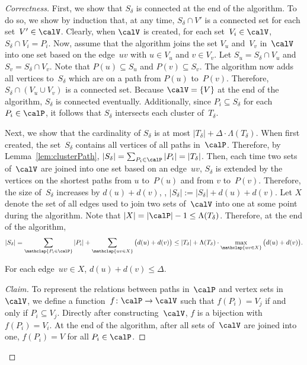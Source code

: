 \begin{proof}
    [Correctness]
First, we show that $S_\delta$ is connected at the end of the algorithm.
To do so, we show by induction that, at any time, $S_\delta \cap V'$ is a connected set for each set~$V' \in \calV$.
Clearly, when $\calV$ is created, for each set~$V_i \in \calV$, $S_\delta \cap V_i = P_i$.
Now, assume that the algorithm joins the set $V_u$ and~$V_v$ in~$\calV$ into one set based on the edge~$uv$ with $u \in V_u$ and $v \in V_v$.
Let $S_u = S_\delta \cap V_u$ and $S_v = S_\delta \cap V_v$.
Note that $P(u) \subseteq S_u$ and $P(v) \subseteq S_v$.
The algorithm now adds all vertices to~$S_\delta$ which are on a path from $P(u)$ to~$P(v)$.
Therefore, $S_\delta \cap (V_u \cup V_v)$ is a connected set.
Because $\calV = \{ V \}$ at the end of the algorithm, $S_\delta$ is connected eventually.
Additionally, since $P_i \subseteq S_\delta$ for each $P_i \in \calP$, it follows that $S_\delta$ intersects each cluster of~$T_\delta$.

Next, we show that the cardinality of $S_\delta$ is at most $|T_\delta| + \Delta \cdot \Lambda(T_\delta)$.
When first created, the set~$S_\delta$ contains all vertices of all paths in~$\calP$.
Therefore, by Lemma~\ref{lem:clusterPath}, $|S_\delta| = \sum_{P_i \in \calP} |P_i| = |T_\delta|$.
Then, each time two sets of~$\calV$ are joined into one set based on an edge~$uv$, $S_\delta$ is extended by the vertices on the shortest paths from $u$ to~$P(u)$ and from $v$ to~$P(v)$.
Therefore, the size of~$S_\delta$ increases by $d(u) + d(v)$, \ie, $|S_\delta| := |S_\delta| + d(u) + d(v)$.
Let $X$ denote the set of all edges used to join two sets of~$\calV$ into one at some point during the algorithm.
Note that $|X| = |\calP| - 1 \leq \Lambda(T_\delta)$.
Therefore, at the end of the algorithm,
\[
    |S_\delta|
        = \sum_{\mathclap{P_i \in \calP}} |P_i| + \sum_{\mathclap{uv \in X}} \big( d(u) + d(v) \big)
        \leq |T_\delta| + \Lambda(T_\delta) \cdot \max_{\mathclap{uv \in X}} \big( d(u) + d(v) \big).
\]

\begin{claim}
For each edge~\( uv \in X \), \( d(u) + d(v) \leq \Delta \).
\end{claim}

\begin{proof}[Claim]
To represent the relations between paths in~$\calP$ and vertex sets in~$\calV$, we define a function~$f \colon \calP \rightarrow \calV$ such that $f(P_i) = V_j$ if and only if $P_i \subseteq V_j$.
Directly after constructing~$\calV$, $f$ is a bijection with $f(P_i) = V_i$.
At the end of the algorithm, after all sets of~$\calV$ are joined into one, $f(P_i) = V$ for all $P_i \in \calP$.


\end{proof}
\end{proof}
